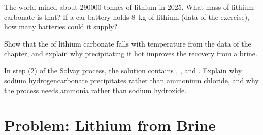 \begin{exercise}[$\star\star\star$]\label{exo:b1:s-block:10}
The world mined about \num{290000} tonnes of lithium in 2025. What mass of
lithium carbonate is that? If a car battery holds \qty{8}{kg} of
lithium (data of the exercise), how many batteries could it supply?
\end{exercise}

\begin{exercise}[$\star\star\star$]\label{exo:b1:s-block:11}
Show that the  of lithium carbonate falls with temperature from
the data of the chapter, and explain why precipitating it hot improves the
recovery from a brine.
\end{exercise}

\begin{exercise}[$\star\star\star$]\label{exo:b1:s-block:12}
In step (2) of the Solvay process, the solution contains ,
,  and . Explain why sodium hydrogencarbonate
precipitates rather than ammonium chloride, and why the process needs
ammonia rather than sodium hydroxide.
\end{exercise}

\section{Problem: Lithium from Brine}

